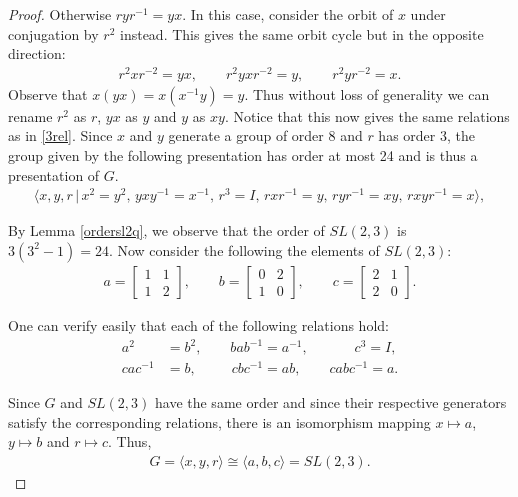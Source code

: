 \documentclass[a4paper , 11pt]{book}
\theoremstyle{definition}
\theoremstyle{remark}
\begin{document}
\begin{proof}
Otherwise $r y r^{-1} = yx$. In this case, consider the orbit of $x$ under conjugation by $r^2$ instead. This gives the same orbit cycle but in the opposite direction:
\begin{align*} r^2 x r^{-2} = yx, \qquad r^2 yx r^{-2} = y, \qquad r^2 y r^{-2} = x.
\end{align*}
Observe that $x(yx) = x (x^{-1} y) = y$. Thus without loss of generality we can rename $r^2$ as $r$, $yx$ as $y$ and $y$ as $xy$. Notice that this now gives the same relations as in \eqref{3rel}. Since $x$ and $y$ generate a group of order 8 and $r$ has order 3, the group given by the following presentation has order at most 24 and is thus a presentation of $G$. 
\begin{align*} \langle x, y, r \, |  \, x^2= y^2, \, y x y^{-1} = x^{-1}, \, r^3 = I, \, r x r^{-1} = y, \, r y r^{-1} = xy, \, r xy r^{-1} = x \rangle,
\end{align*}

By Lemma \ref{ordersl2q}, we observe that the order of $SL(2,3)$ is $3(3^2-1) = 24$. Now consider the following the elements of $SL(2,3)$:
\begin{align*} a = \begin{bmatrix} 1 & 1 \\ 1 & 2 \end{bmatrix}, \qquad b = \begin{bmatrix} 0 & 2 \\ 1 & 0 \end{bmatrix}, \qquad c = \begin{bmatrix} 2 & 1 \\ 2 & 0 \end{bmatrix}.
\end{align*}

One can verify easily that each of the following relations hold:
\begin{align*} a^2 &= b^2, \qquad b a b^{-1} = a^{-1}, \qquad \quad \; c^3 = I, 
\\ c a c^{-1} &= b,  \qquad \; \: c b c^{-1} = ab, \qquad \! c ab c^{-1} = a.
\end{align*}

Since $G$ and $SL(2,3)$ have the same order and since their respective generators satisfy the corresponding relations, there is an isomorphism mapping $x \mapsto a$, $y \mapsto b$ and $r \mapsto c$. Thus,
\begin{align*} G = \langle x, y, r \rangle \cong \langle a, b, c \rangle = SL(2,3). 
\end{align*} 
\end{proof}
\end{document}
